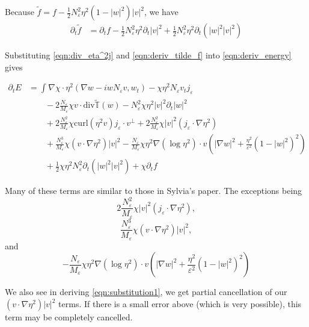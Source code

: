 \documentclass[a4paper]{article}
\newcommand{\curl}{\mathrm{curl}}
\renewcommand{\div}{\mathrm{div}}
\begin{document}
Because $\tilde{f} = f - \frac{1}{2} N_\varepsilon^2 \eta^2 (1-|w|^2)|v|^2$, we have
\begin{align}
  \partial_t \tilde{f} &= \partial_t f - \frac{1}{2} N_\varepsilon^2 \eta^2 \partial_t |v|^2 + \frac{1}{2} N_\varepsilon^2 \eta^2 \partial_t ( |w|^2
  |v|^2 )
  \label{eqn:deriv_tilde_f}
\end{align}

Substituting \eqref{eqn:div_eta^2j} and \eqref{eqn:deriv_tilde_f} into \eqref{eqn:deriv_energy} gives

\begin{align}
  \partial_t E &= \int_{}^{} \nabla \chi \cdot \eta^2 ( \nabla w - i w N_\varepsilon v, w_t) - \chi \eta^2 N_\varepsilon v_t j_\varepsilon \nonumber
  \\
  &\quad \quad -2 \frac{N_\varepsilon}{M_\varepsilon} \chi v \cdot \div \tilde{\mathbb{T}}(w) -
  N_\varepsilon^2 \chi \eta^2 |v|^2 \partial_t |w|^2  \nonumber \\
  &\quad \quad+ 2 \frac{N_\varepsilon^2}{M_\varepsilon} \chi \curl(\eta^2 v) j_\varepsilon \cdot v^\perp + 2 \frac{N_\varepsilon^2}{M_\varepsilon} \chi
  |v|^2 (j_\varepsilon \cdot \nabla \eta^2) \nonumber \\
  &\quad \quad + \frac{N_\varepsilon^3}{M_\varepsilon} \chi (v \cdot \nabla \eta^2) |v|^2 - \frac{N_\varepsilon}{M_\varepsilon} \chi \eta^2 \nabla(
  \log \eta^2 ) \cdot v \left( | \nabla w |^2 + \frac{\eta^2}{\varepsilon^2} (1-|w|^2)^2 \right) \nonumber \\
  &\quad \quad + \frac{1}{2} \chi \eta^2 N_\varepsilon^2 \partial_t (|w|^2 |v|^2) + \chi \partial_t f
  \label{eqn:deriv_energy2}
\end{align}

Many of these terms are similar to those in Sylvia's paper. The exceptions being
\[ 2 \frac{N_\varepsilon^2}{M_\varepsilon} \chi |v|^2 (j_\varepsilon \cdot \nabla \eta^2) , \]
\[ \frac{N_\varepsilon^3}{M_\varepsilon} \chi (v \cdot \nabla \eta^2) |v|^2 , \]
and
\[ - \frac{N_\varepsilon}{M_\varepsilon} \chi \eta^2 \nabla ( \log \eta^2 ) \cdot v \left( | \nabla w |^2 + \frac{\eta^2}{\varepsilon^2} ( 1-|w|^2)^2
\right) \]

We also see in deriving \eqref{eqn:substitution1}, we get partial cancellation of our $ (v \cdot \nabla \eta^2) |v|^2$ terms. If there is a small
error above (which is very possible), this term may be completely cancelled.
\end{document}
